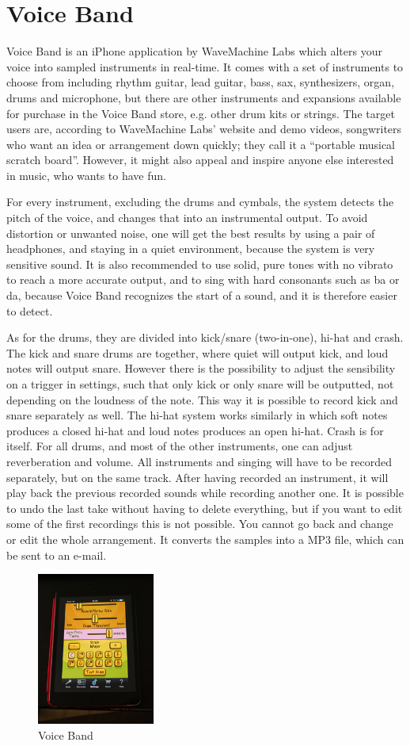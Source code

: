 \section{Voice Band}
Voice Band is an iPhone application by WaveMachine Labs which alters your voice into sampled instruments in real-time. It comes with a set of instruments to choose from including rhythm guitar, lead guitar, bass, sax, synthesizers, organ, drums and microphone, but there are other instruments and expansions available for purchase in the Voice Band store, e.g. other drum kits or strings. The target users are, according to WaveMachine Labs’ website and demo videos, songwriters who want an idea or arrangement down quickly; they call it a “portable musical scratch board”. However, it might also appeal and inspire anyone else interested in music, who wants to have fun. 

For every instrument, excluding the drums and cymbals, the system detects the pitch of the voice, and changes that into an instrumental output. To avoid distortion or unwanted noise, one will get the best results by using a pair of headphones, and staying in a quiet environment, because the system is very sensitive sound. It is also recommended to use solid, pure tones with no vibrato to reach a more accurate output, and to sing with hard consonants such as ba or da, because Voice Band recognizes the start of a sound, and it is therefore easier to detect.  

As for the drums, they are divided into kick/snare (two-in-one), hi-hat and crash. The kick and snare drums are together, where quiet will output kick, and loud notes will output snare. However there is the possibility to adjust the sensibility on a trigger in settings, such that only kick or only snare will be outputted, not depending on the loudness of the note. This way it is possible to record kick and snare separately as well. The hi-hat system works similarly in which soft notes produces a closed hi-hat and loud notes produces an open hi-hat. Crash is for itself. For all drums, and most of the other instruments, one can adjust reverberation and volume. 
All instruments and singing will have to be recorded separately, but on the same track. After having recorded an instrument, it will play back the previous recorded sounds while recording another one. It is possible to undo the last take without having to delete everything, but if you want to edit some of the first recordings this is not possible.  You cannot go back and change or edit the whole arrangement. It converts the samples into a MP3 file, which can be sent to an e-mail. 

\begin{figure}[h]
	\begin{center}
		\includegraphics[height=5cm]{fig/voiceband.png}
		\caption{Voice Band}
		\label{VoiceBand}
	\end{center}
\end{figure}
